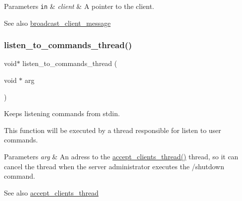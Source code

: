 \begin{DoxyParams}[1]{Parameters}
\mbox{\tt in}  & {\em client} & A pointer to the client.\\
\hline
\end{DoxyParams}
\begin{DoxySeeAlso}{See also}
\hyperlink{zip-zop-server_8c_a36e911ded647a0697ca152cae890bcf5}{broadcast\+\_\+client\+\_\+message} 
\end{DoxySeeAlso}
\mbox{\label{zip-zop-server_8c_aecc6f61fca90c0a9fa8093c7cc0eb687}} 
\subsubsection{\texorpdfstring{listen\+\_\+to\+\_\+commands\+\_\+thread()}{listen\_to\_commands\_thread()}}
{\footnotesize\ttfamily void$\ast$ listen\+\_\+to\+\_\+commands\+\_\+thread (\begin{DoxyParamCaption}\item[{void $\ast$}]{arg }\end{DoxyParamCaption})}



Keeps listening commands from stdin. 

This function will be executed by a thread responsible for listen to user commands.


\begin{DoxyParams}{Parameters}
{\em arg} & An adress to the \hyperlink{zip-zop-server_8c_aebe94d23e0b61c3ffd1df3a19071fb4b}{accept\+\_\+clients\+\_\+thread()} thread, so it can cancel the thread when the server administrator executes the {\ttfamily /shutdown} command.\\
\hline
\end{DoxyParams}
\begin{DoxySeeAlso}{See also}
\hyperlink{zip-zop-server_8c_aebe94d23e0b61c3ffd1df3a19071fb4b}{accept\+\_\+clients\+\_\+thread} 
\end{DoxySeeAlso}
\mbox{\label{zip-zop-server_8c_a840291bc02cba5474a4cb46a9b9566fe}} 
